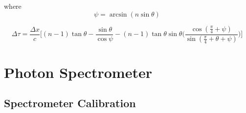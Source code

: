 where
\begin{equation}
	\psi = \arcsin(n\sin\theta)
\end{equation}

\begin{equation}
\label{eqn:time_delay}
	\Delta\tau = \frac{\Delta x}{c}\Bigg[(n-1)\tan\theta - \frac{\sin\theta}{\cos\psi}-(n-1)\tan\theta\sin\theta\bigg(\frac{\cos(\frac{\pi}{4}+\psi)}{\sin(\frac{\pi}{4}+\theta+\psi)}\bigg)\Bigg]
\end{equation}

\section{Photon Spectrometer}
\label{sec:photon_spec}
\subsection{Spectrometer Calibration}
\label{subsec:spec_calibration}